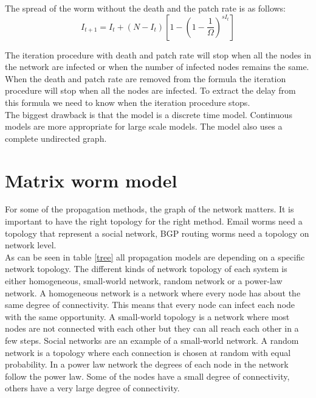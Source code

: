 The spread of the worm without the death and the patch rate is as follows:
\begin{equation}
I_{t+1}=I_{t}+(N-I_{t})[1-(1-\dfrac{1}{\Omega})^{sI_{t}}]
\end{equation}

The iteration procedure with death and patch rate will stop when all the nodes in the network are infected or when the number of infected nodes remains the same. When the death and patch rate are removed from the formula the iteration procedure will stop when all the nodes are infected. To extract the delay from this formula we need to know when the iteration procedure stops. \\
The biggest drawback is that the model is a discrete time model. Continuous models are more appropriate for large scale models. The model also uses a complete undirected graph.







\section{Matrix worm model}
\label{eigenmatrixmethode}
For some of the propagation methods, the graph of the network matters. It is important to have the right topology for the right method. Email worms need a topology that represent a social network, BGP routing worms need a topology on network level. \\

As can be seen in table \ref{tree} all propagation models are depending on a specific network topology. The different kinds of network topology of each system is either homogeneous, small-world network, random network or a power-law network. A homogeneous network is a network where every node has about the same degree of connectivity. This means that every node can infect each node with the same opportunity. A small-world topology is a network where most nodes are not connected with each other but they can all reach each other in a few steps. Social networks are an example of a small-world network. A random network is a topology where each connection is chosen at random with equal probability. In a power law network the degrees of each node in the network follow the power law. Some of the nodes have a small degree of connectivity, others have a very large degree of connectivity.\\

